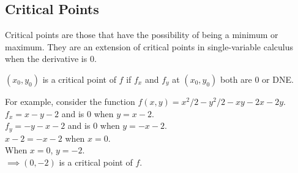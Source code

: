 \subsection{Critical Points}
\noindent
Critical points are those that have the possibility of being a minimum or maximum. They are an extension of critical points in single-variable calculus when the derivative is 0.\\

\noindent
\begin{definition}
	$(x_0, y_0)$ is a critical point of $f$ if $f_x$ and $f_y$ at $(x_0, y_0)$ both are 0 or DNE.
\end{definition}

\noindent
For example, consider the function $f(x,y) = x^2/2 - y^2/2 - xy - 2x - 2y$.\\
\indent
$f_x = x - y - 2$ and is 0 when $y = x-2$.\\
\indent
$f_y = -y - x - 2$ and is 0 when $y = -x-2$.\\
\indent
$x - 2 = -x -2$ when $x = 0$.\\
\indent
When $x = 0$, $ y =-2$.\\
\indent
$\implies (0, -2)$ is a critical point of $f$.

